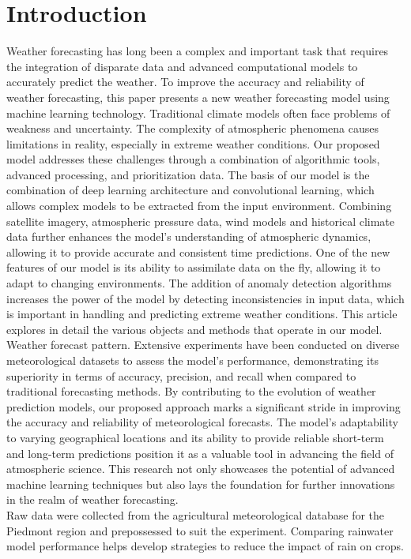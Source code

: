 \documentclass[conference, onecolumn]{IEEEtran}
\begin{document}
\section{\textbf{Introduction}}
Weather forecasting has long been a complex and important task that requires the integration of disparate data and advanced computational models to accurately predict the weather. To improve the accuracy and reliability of weather forecasting, this paper presents a new weather forecasting model using machine learning technology. Traditional climate models often face problems of weakness and uncertainty. The complexity of atmospheric phenomena causes limitations in reality, especially in extreme weather conditions. Our proposed model addresses these challenges through a combination of algorithmic tools, advanced processing, and prioritization data. The basis of our model is the combination of deep learning architecture and convolutional learning, which allows complex models to be extracted from the input environment. Combining satellite imagery, atmospheric pressure data, wind models and historical climate data further enhances the model's understanding of atmospheric dynamics, allowing it to provide accurate and consistent time predictions. One of the new features of our model is its ability to assimilate data on the fly, allowing it to adapt to changing environments. The addition of anomaly detection algorithms increases the power of the model by detecting inconsistencies in input data, which is important in handling and predicting extreme weather conditions. This article explores in detail the various objects and methods that operate in our model. Weather forecast pattern. Extensive experiments have been conducted on diverse meteorological datasets to assess the model's performance, demonstrating its superiority in terms of accuracy, precision, and recall when compared to traditional forecasting methods. By contributing to the evolution of weather prediction models, our proposed approach marks a significant stride in improving the accuracy and reliability of meteorological forecasts. The model's adaptability to varying geographical locations and its ability to provide reliable short-term and long-term predictions position it as a valuable tool in advancing the field of atmospheric science. This research not only showcases the potential of advanced machine learning techniques but also lays the foundation for further innovations in the realm of weather forecasting.
\\ \indent Raw data were collected from the agricultural meteorological database for the Piedmont region and prepossessed to suit the experiment. Comparing rainwater model performance helps develop strategies to reduce the impact of rain on crops.
\end{document}
